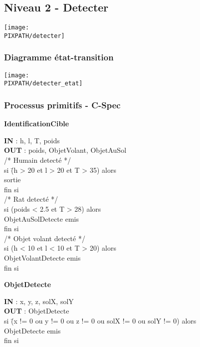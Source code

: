 \subsection{Niveau 2 - Detecter}

\begin{center}
\texttt{[image: \\PIXPATH/detecter]}
\end{center}


\subsubsection{Diagramme état-transition}

\begin{center}
\texttt{[image: \\PIXPATH/detecter\_etat]}
\end{center}

\vfill
\pagebreak

\subsubsection{Processus primitifs - C-Spec}

\begin{description}
	
	\item \textbf{IdentificationCible}
		\begin{tabbing} 
		\textbf{IN} : h, l, T, poids \\
		\textbf{OUT} : poids, ObjetVolant, ObjetAuSol \\			
		/* Humain detecté */ \\
		si \=(h > 20 et l > 20 et T > 35) alors \\
			\>sortie \\
		fin si \\
		/* Rat detecté */ \\
		si (poids < 2.5 et T > 28) alors \\
			\>ObjetAuSolDetecte emis \\
		fin si \\
		/* Objet volant detecté */ \\
		si (h < 10 et l < 10 et T > 20) alors \\
			\>ObjetVolantDetecte emis \\
		fin si 
		\end{tabbing}
			

	\item \textbf{ObjetDetecte}
		\begin{tabbing} 
		\textbf{IN} : x, y, z, solX, solY \\
		\textbf{OUT} : ObjetDetecte \\
		si \=(x != 0 ou y != 0 ou z != 0 ou solX != 0 ou solY != 0) alors \\
		\>ObjetDetecte emis \\
		fin si
		\end{tabbing} 

\end{description}

\vfill
\pagebreak


